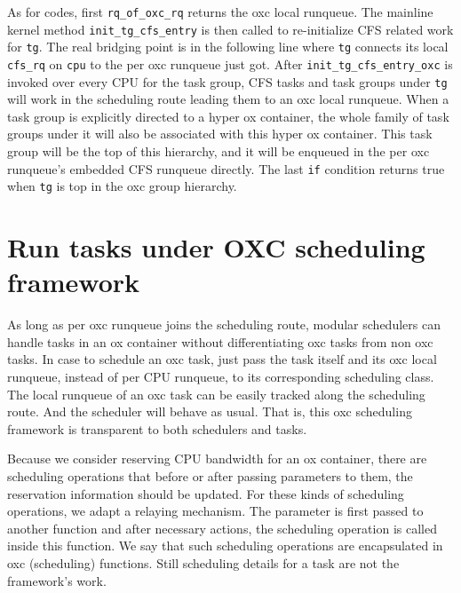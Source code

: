 As for codes, first \texttt{rq\_of\_oxc\_rq} returns the oxc local runqueue.
The mainline kernel method \texttt{init\_tg\_cfs\_entry} is then called to 
re-initialize CFS related work for \texttt{tg}. 
The real bridging point is in the following line where 
\texttt{tg} connects its local \texttt{cfs\_rq} on 
\texttt{cpu} to the per oxc runqueue just got. After 
\texttt{init\_tg\_cfs\_entry\_oxc} is invoked over every CPU for the 
task group, CFS tasks and task groups under \texttt{tg} will work in 
the scheduling route leading them to an oxc local runqueue. When a task 
group is explicitly directed to a hyper ox container, the whole family of 
task groups under it will also be associated with this hyper ox container. 
This task group will be the top of this hierarchy, and it will be enqueued 
in the per oxc runqueue's embedded CFS runqueue directly. The last 
\texttt{if} condition returns true when \texttt{tg} is top in the oxc 
group hierarchy.

\section{Run tasks under OXC scheduling framework\label{sec:run}}

As long as per oxc runqueue joins the scheduling route, modular schedulers
can handle tasks in an ox container without differentiating oxc tasks from
non oxc tasks.
In case to schedule an oxc task, just pass the task itself and its oxc 
local runqueue, instead of per CPU runqueue, to its corresponding 
scheduling class. The local runqueue of an oxc task can be easily tracked 
along the scheduling route. And the scheduler will behave as usual. That 
is, this oxc scheduling framework is transparent to both schedulers and 
tasks.

Because we consider reserving CPU bandwidth for an ox container, there
are scheduling operations that before or after passing parameters to them,
the reservation information should be updated. For these kinds of scheduling
operations, we adapt a relaying mechanism. The parameter is first passed to
another function and after necessary actions, the scheduling operation is
called inside this function. We say that such scheduling operations are
encapsulated in oxc (scheduling) functions.
Still scheduling details for a task are not the framework's work. 

